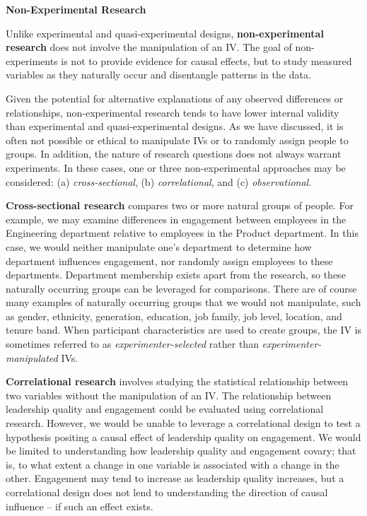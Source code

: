\documentclass[
]{book}
\begin{document}
\textbf{Non-Experimental Research}

Unlike experimental and quasi-experimental designs, \textbf{non-experimental research} does not involve the manipulation of an IV. The goal of non-experiments is not to provide evidence for causal effects, but to study measured variables as they naturally occur and disentangle patterns in the data.

Given the potential for alternative explanations of any observed differences or relationships, non-experimental research tends to have lower internal validity than experimental and quasi-experimental designs. As we have discussed, it is often not possible or ethical to manipulate IVs or to randomly assign people to groups. In addition, the nature of research questions does not always warrant experiments. In these cases, one or three non-experimental approaches may be considered: (a) \emph{cross-sectional}, (b) \emph{correlational}, and (c) \emph{observational}.

\textbf{Cross-sectional research} compares two or more natural groups of people. For example, we may examine differences in engagement between employees in the Engineering department relative to employees in the Product department. In this case, we would neither manipulate one's department to determine how department influences engagement, nor randomly assign employees to these departments. Department membership exists apart from the research, so these naturally occurring groups can be leveraged for comparisons. There are of course many examples of naturally occurring groups that we would not manipulate, such as gender, ethnicity, generation, education, job family, job level, location, and tenure band. When participant characteristics are used to create groups, the IV is sometimes referred to as \emph{experimenter-selected} rather than \emph{experimenter-manipulated} IVs.

\textbf{Correlational research} involves studying the statistical relationship between two variables without the manipulation of an IV. The relationship between leadership quality and engagement could be evaluated using correlational research. However, we would be unable to leverage a correlational design to test a hypothesis positing a causal effect of leadership quality on engagement. We would be limited to understanding how leadership quality and engagement covary; that is, to what extent a change in one variable is associated with a change in the other. Engagement may tend to increase as leadership quality increases, but a correlational design does not lend to understanding the direction of causal influence -- if such an effect exists.
\end{document}

